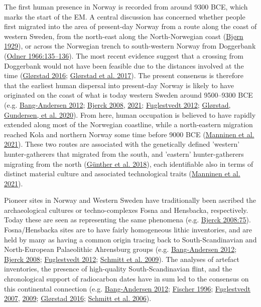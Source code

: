 \documentclass[
  12pt,
  a4paper,
  oneside]{book}
\begin{document}
The first human presence in Norway is recorded from around 9300 BCE, which marks the start of the EM. A central discussion has concerned whether people first migrated into the area of present-day Norway from a route along the coast of western Sweden, from the north-east along the North-Norwegian coast (\protect\hyperlink{ref-bjuxf8rn1929}{Bjørn 1929}), or across the Norwegian trench to south-western Norway from Doggerbank (\protect\hyperlink{ref-odner1966}{Odner 1966:135--136}). The most recent evidence suggest that a crossing from Doggerbank would not have been feasible due to the distances involved at the time (\protect\hyperlink{ref-glorstad2016}{Glørstad 2016}; \protect\hyperlink{ref-glorstad2017}{Glørstad et al. 2017}). The present consensus is therefore that the earliest human dispersal into present-day Norway is likely to have originated on the coast of what is today western Sweden around 9500--9300 BCE (e.g. \protect\hyperlink{ref-bang-andersen2012}{Bang-Andersen 2012}; \protect\hyperlink{ref-bjerck2008}{Bjerck 2008}, \protect\hyperlink{ref-bjerck2021}{2021}; \protect\hyperlink{ref-fuglestvedt2012}{Fuglestvedt 2012}; \protect\hyperlink{ref-glorstad2020}{Glørstad, Gundersen, et al. 2020}). From here, human occupation is believed to have rapidly extended along most of the Norwegian coastline, while a north-eastern migration reached Kola and northern Norway some time before 9000 BCE (\protect\hyperlink{ref-manninen2021}{Manninen et al. 2021}). These two routes are associated with the genetically defined 'western' hunter-gatherers that migrated from the south, and 'eastern' hunter-gatherers migrating from the north (\protect\hyperlink{ref-gunther2018}{Günther et al. 2018}), each identifiable also in terms of distinct material culture and associated technological traits (\protect\hyperlink{ref-manninen2021}{Manninen et al. 2021}).

Pioneer sites in Norway and Western Sweden have traditionally been ascribed the archaeological cultures or techno-complexes Fosna and Hensbacka, respectively. Today these are seen as representing the same phenomena (e.g. \protect\hyperlink{ref-bjerck2008}{Bjerck 2008:75}). Fosna/Hensbacka sites are to have fairly homogeneous lithic inventories, and are held by many as having a common origin tracing back to South-Scandinavian and North-European Palaeolithic Ahrensburg groups (e.g. \protect\hyperlink{ref-bang-andersen2012}{Bang-Andersen 2012}; \protect\hyperlink{ref-bjerck2008}{Bjerck 2008}; \protect\hyperlink{ref-fuglestvedt2012}{Fuglestvedt 2012}; \protect\hyperlink{ref-schmitt2009}{Schmitt et al. 2009}). The analyses of artefact inventories, the presence of high-quality South-Scandinavian flint, and the chronological support of radiocarbon dates have in sum led to the consensus on this continental connection (e.g. \protect\hyperlink{ref-bang-andersen2012}{Bang-Andersen 2012}; \protect\hyperlink{ref-fischer1996}{Fischer 1996}; \protect\hyperlink{ref-fuglestvedt2007}{Fuglestvedt 2007}, \protect\hyperlink{ref-fuglestvedt2009}{2009}; \protect\hyperlink{ref-glorstad2016}{Glørstad 2016}; \protect\hyperlink{ref-schmitt2006}{Schmitt et al. 2006}).
\end{document}

